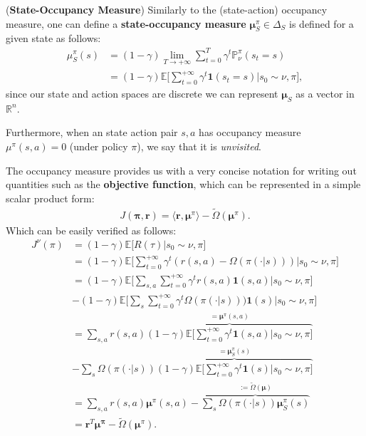 \begin{definition}
    (\textbf{State-Occupancy Measure}) 
    Similarly to the (state-action) occupancy measure, one can define a \textbf{state-occupancy measure} $\bm{\mu}^\pi_S \in \Delta_{S}$ is defined for a given state as follows:
    \begin{align*}
        \mu^\pi_S(s) &= (1-\gamma) \lim_{T \rightarrow + \infty} \sum_{t=0}^T \gamma^t \mathbb{P}_\nu^\pi(s_t=s) \\
        &= (1-\gamma)  \mathbb{E} \Big[ \sum_{t=0}^{+\infty} \gamma^t \mathbf{1}(s_t=s) \Big| s_0 \sim \nu, \pi\Big],
    \end{align*}
    since our state and action spaces are discrete we can represent $\bm{\mu}_S$ as a vector in $\mathbb{R}^{n}$.
\end{definition}
\noindent
Furthermore, when an state action pair $s,a$ has occupancy measure $\mu^\pi(s,a)=0$ (under policy $\pi$), we say that it is \textit{unvisited}. 

\begin{observation}
    \label{obs:mu_pi_objective}
    The occupancy measure provides us with a very concise notation for writing out quantities such as the \textbf{objective function}, which can be represented in a simple scalar product form:
    \begin{align*}
        J(\bm{\pi},\bm{r}) = \langle \bm{r}, \bm{\mu}^\pi \rangle - \tilde{\Omega}(\bm{\mu}^\pi).
    \end{align*}
    Which can be easily verified as follows:
    \begin{align*}
        J^\nu(\pi) &= (1-\gamma)  \mathbb{E}\Big[ R(\tau) \Big| s_0 \sim \nu, \pi \Big] \\
                &=  (1-\gamma) \mathbb{E}\Bigg[ \sum_{t=0}^{+\infty} \gamma^t (r(s,a) - \Omega(\pi(\cdot|s))) \Big| s_0 \sim \nu, \pi \Bigg]\\
                &= (1-\gamma)  \mathbb{E}\Bigg[ \sum_{s,a} \sum_{t=0}^{+\infty} \gamma^t  r(s,a) \textbf{1}(s,a) \Big| s_0 \sim \nu, \pi \Bigg] \\& -  (1-\gamma)  \mathbb{E}\Bigg[ \sum_{s} \sum_{t=0}^{+\infty} \gamma^t \Omega(\pi(\cdot|s))) \textbf{1}(s) \Big| s_0 \sim \nu, \pi \Bigg]   \\
                &= \sum_{s,a} r(s,a)\overbrace{ (1-\gamma) \mathbb{E}\Bigg[  \sum_{t=0}^{+\infty}\gamma^t  \textbf{1}(s,a) \Big| s_0 \sim \nu, \pi \Bigg]}^{=\bm{\mu}^\pi(s,a)}\\
                &- \sum_{s} \Omega(\pi(\cdot|s)) \overbrace{ (1-\gamma) \mathbb{E}\Bigg[  \sum_{t=0}^{+\infty} \gamma^t \textbf{1}(s) \Big| s_0 \sim \nu, \pi \Bigg]}^{=\bm{\mu}_S^\pi(s)}\\
                &= \sum_{s,a} r(s,a) \bm{\mu}^\pi(s,a) - \overbrace{\sum_{s} \Omega(\pi(\cdot|s)) \bm{\mu}_S^\pi(s) }^{:=\tilde{\Omega}(\bm{\mu})}\\
                &=  \bm{r}^T \bm{\bm{\mu}^\pi} - \tilde{\Omega}(\bm{\bm{\mu}}^\pi).
    \end{align*}
\end{observation}

